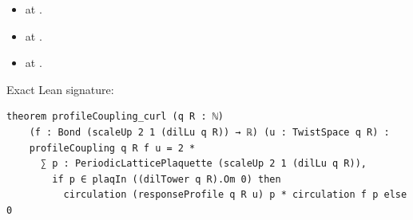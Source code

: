 \begin{theorem}[bp-143]
\begin{itemize}
\item \texttt{} at \texttt{}.
\item \texttt{} at \texttt{}.
\item \texttt{} at \texttt{}.
\end{itemize}
\par Exact Lean signature:
\begin{verbatim}
theorem profileCoupling_curl (q R : ℕ)
    (f : Bond (scaleUp 2 1 (dilLu q R)) → ℝ) (u : TwistSpace q R) :
    profileCoupling q R f u = 2 *
      ∑ p : PeriodicLatticePlaquette (scaleUp 2 1 (dilLu q R)),
        if p ∈ plaqIn ((dilTower q R).Om 0) then
          circulation (responseProfile q R u) p * circulation f p else 0
\end{verbatim}
\end{theorem}

